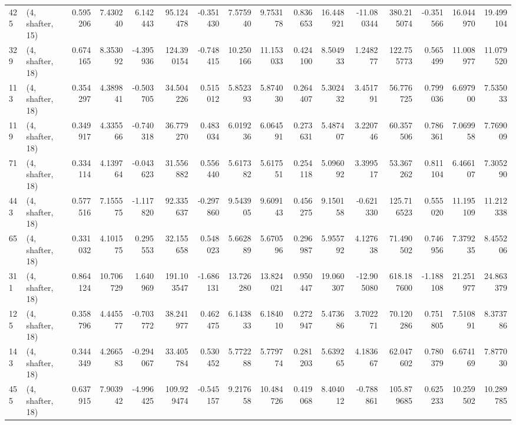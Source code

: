 \begin{tabular}{llrrrrrrrrrrrrrr}
425 &  (4, shafter, 15) &   0.595206 &   7.430240 &   6.142443 &    95.124478 &  -0.351430 &   7.575940 &   9.753178 &  0.836653 &  16.448921 & -11.080344 &   380.215074 & -0.351566 &  16.044970 &  19.499104 \\
329 &  (4, shafter, 18) &   0.674165 &   8.353092 &  -4.395936 &   124.390154 &  -0.748415 &  10.250166 &  11.153033 &  0.424100 &   8.504933 &   1.248277 &   122.755773 &  0.565499 &  11.008977 &  11.079520 \\
113 &  (4, shafter, 18) &   0.354297 &   4.389841 &  -0.503705 &    34.504226 &   0.515012 &   5.852393 &   5.874030 &  0.264407 &   5.302432 &   3.451791 &    56.776725 &  0.799036 &   6.697900 &   7.535033 \\
119 &  (4, shafter, 18) &   0.349917 &   4.335566 &  -0.740318 &    36.779270 &   0.483034 &   6.019236 &   6.064591 &  0.273631 &   5.487407 &   3.220746 &    60.357506 &  0.786361 &   7.069958 &   7.769009 \\
71  &  (4, shafter, 18) &   0.334114 &   4.139764 &  -0.043623 &    31.556882 &   0.556440 &   5.617382 &   5.617551 &  0.254118 &   5.096092 &   3.399517 &    53.367262 &  0.811104 &   6.466107 &   7.305290 \\
443 &  (4, shafter, 18) &   0.577516 &   7.155575 &  -1.117820 &    92.335637 &  -0.297860 &   9.543905 &   9.609143 &  0.456275 &   9.150158 &  -0.621330 &   125.716523 &  0.555020 &  11.195109 &  11.212338 \\
65  &  (4, shafter, 18) &   0.331032 &   4.101575 &   0.295553 &    32.155658 &   0.548023 &   5.662889 &   5.670596 &  0.296987 &   5.955792 &   4.127638 &    71.490502 &  0.746956 &   7.379235 &   8.455206 \\
311 &  (4, shafter, 18) &   0.864124 &  10.706729 &   1.640969 &   191.103547 &  -1.686131 &  13.726280 &  13.824021 &  0.950447 &  19.060307 & -12.905080 &   618.187600 & -1.188108 &  21.251977 &  24.863379 \\
125 &  (4, shafter, 18) &   0.358796 &   4.445577 &  -0.703772 &    38.241977 &   0.462475 &   6.143833 &   6.184010 &  0.272947 &   5.473686 &   3.702271 &    70.120286 &  0.751805 &   7.510891 &   8.373786 \\
143 &  (4, shafter, 18) &   0.344349 &   4.266583 &  -0.294067 &    33.405784 &   0.530452 &   5.772288 &   5.779774 &  0.281203 &   5.639265 &   4.183667 &    62.047602 &  0.780379 &   6.674169 &   7.877030 \\
455 &  (4, shafter, 18) &   0.637915 &   7.903942 &  -4.996425 &   109.929474 &  -0.545157 &   9.217658 &  10.484726 &  0.419068 &   8.404012 &  -0.788861 &   105.879685 &  0.625233 &  10.259502 &  10.289785 \\

\end{tabular}
